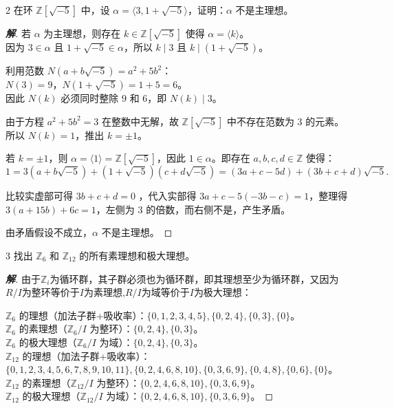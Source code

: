 \documentclass[12pt, a4paper]{article}
\newenvironment{solution}{
    \begin{proof}[\textbf{解}]
}{
    \end{proof}
}
\begin{document}
\begin{problem}{2}
    在环 $\mathbb{Z}[\sqrt{-5}]$ 中，设 $\alpha = \langle 3, 1+\sqrt{-5} \rangle$，证明：$\alpha$ 不是主理想。
\end{problem}
\begin{solution}
    若 $\alpha$ 为主理想，则存在 $k \in \mathbb{Z}[\sqrt{-5}]$ 使得 $\alpha = \langle k \rangle$。\\
    因为 $3 \in \alpha$ 且 $1+\sqrt{-5} \in \alpha$，所以 $k \mid 3$ 且 $k \mid (1+\sqrt{-5})$。
    
    利用范数 $N(a+b\sqrt{-5}) = a^2+5b^2$：\\
    $N(3) = 9$，$N(1+\sqrt{-5}) = 1+5 = 6$。\\
    因此 $N(k)$ 必须同时整除 $9$ 和 $6$，即 $N(k) \mid 3$。
    
    由于方程 $a^2+5b^2 = 3$ 在整数中无解，故 $\mathbb{Z}[\sqrt{-5}]$ 中不存在范数为 $3$ 的元素。\\
    所以 $N(k) = 1$，推出 $k = \pm 1$。
    
    若 $k = \pm 1$，则 $\alpha = \langle 1 \rangle = \mathbb{Z}[\sqrt{-5}]$，因此 $1 \in \alpha$。即存在 $a,b,c,d \in \mathbb{Z}$ 使得：
    \[
        1 = 3(a+b\sqrt{-5}) + (1+\sqrt{-5})(c+d\sqrt{-5}) = (3a+c-5d) + (3b+c+d)\sqrt{-5}.
    \]
    
    比较实虚部可得 $3b+c+d=0$ ，代入实部得 $3a + c - 5(-3b-c) = 1$，整理得 $3(a+15b) + 6c = 1$，左侧为 $3$ 的倍数，而右侧不是，产生矛盾。
    
    由矛盾假设不成立，$\alpha$ 不是主理想。
\end{solution}


\begin{problem}{3}
    找出 $\mathbb{Z}_6$ 和 $\mathbb{Z}_{12}$ 的所有素理想和极大理想。
\end{problem}
\begin{solution}
    由于$\mathbb{Z}_i$为循环群，其子群必须也为循环群，即其理想至少为循环群，又因为$R/I$为整环等价于$I$为素理想,$R/I$为域等价于$I$为极大理想：
    
    $\mathbb{Z}_6$ 的理想（加法子群+吸收率）：$\{0,1,2,3,4,5\}, \{0,2,4\}, \{0,3\}, \{0\}$。\\
    $\mathbb{Z}_6$ 的素理想（$\mathbb{Z}_6/I$ 为整环）：$\{0,2,4\}, \{0,3\}$。\\
    $\mathbb{Z}_6$ 的极大理想（$\mathbb{Z}_6/I$ 为域）：$\{0,2,4\}, \{0,3\}$。\\

    $\mathbb{Z}_{12}$ 的理想（加法子群+吸收率）：$\{0,1,2,3,4,5,6,7,8,9,10,11\}, \{0,2,4,6,8,10\}, \{0,3,6,9\}, \{0,4,8\}, \{0,6\}, \{0\}$。\\
    $\mathbb{Z}_{12}$ 的素理想（$\mathbb{Z}_{12}/I$ 为整环）：$\{0,2,4,6,8,10\}, \{0,3,6,9\}$。\\
    $\mathbb{Z}_{12}$ 的极大理想（$\mathbb{Z}_{12}/I$ 为域）：$\{0,2,4,6,8,10\}, \{0,3,6,9\}$。
\end{solution}
    
\end{document}
